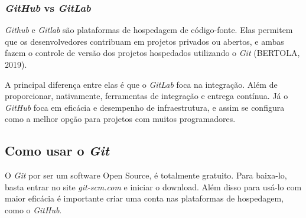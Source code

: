 \documentclass{article}
\begin{document}
\subsubsection{\textit{GitHub} vs \textit{GitLab}}
\hspace{4mm}\textit{Github} e \textit{Gitlab} são plataformas de hospedagem de código-fonte. Elas permitem que os desenvolvedores contribuam em projetos privados ou abertos, e ambas fazem o controle de versão dos projetos hospedados utilizando o \textit{Git} (BERTOLA, 2019).

A principal diferença entre elas é que o \textit{GitLab} foca na integração. Além de proporcionar, nativamente, ferramentas de integração e entrega contínua. Já o \textit{GitHub} foca em eficácia e desempenho de infraestrutura, e assim se configura como a melhor opção para projetos com muitos programadores. 
\subsection{Como usar o \textit{Git}}
\hspace{4mm}O \textit{Git} por ser um software Open Source, é totalmente gratuito. Para baixa-lo, basta entrar no site \textit{git-scm.com} e iniciar o download. Além disso para usá-lo com maior eficácia é importante criar uma conta nas plataformas de hospedagem, como o \textit{GitHub}.
\end{document}
